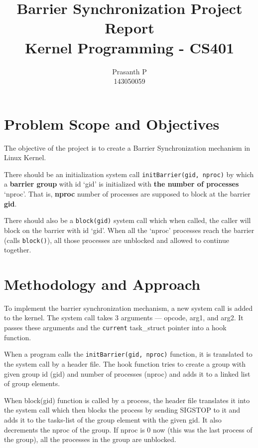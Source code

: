 \documentclass[12px]{report}
\title{Barrier Synchronization Project Report\\ Kernel Programming - CS401}
\author{Prasanth P\\143050059}
\date{}
\begin{document}
\maketitle

\section{Problem Scope and Objectives} %
The objective of the project is to create a Barrier Synchronization mechanism in Linux Kernel. 

There should be an initialization system call \texttt{initBarrier(gid, nproc)} by which a \textbf{barrier group} with id `gid' is initialized with \textbf{the number of processes} `nproc'. That is, \textbf{nproc} number of processes are supposed to block at the barrier \textbf{gid}. 

There should also be a \texttt{block(gid)} system call which when called, the caller will block on the barrier with id `gid'. When all the `nproc' processes reach the barrier (calls \texttt{block()}), all those processes are unblocked and allowed to continue together.


\section{Methodology and Approach} %
To implement the barrier synchronization mechanism, a new system call is added to the kernel. The system call takes 3 arguments --- opcode, arg1, and arg2. It passes these arguments and the \texttt{current} task\_struct pointer into a hook function.

When a program calls the \texttt{initBarrier(gid, nproc)} function, it is translated to the system call by a header file. The hook function tries to create a group with given group id (gid) and number of processes (nproc) and adds it to a linked list of group elements.

When block(gid) function is called by a process, the header file translates it into the system call which then blocks the process by sending SIGSTOP to it and adds it to the tasks-list of the group element with the given gid. It also decrements the nproc of the group. If nproc is 0 now (this was the last process of the group), all the processes in the group are unblocked.

\end{document}
